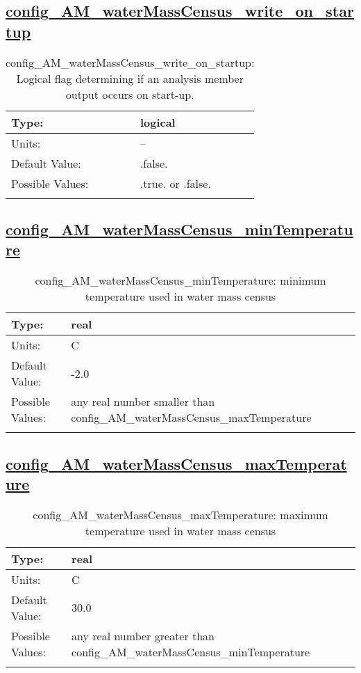 \subsection[config\_AM\_waterMassCensus\_write\_on\_startup]{\hyperref[sec:nm_tab_AM_waterMassCensus]{config\_AM\_waterMassCensus\_write\_on\_startup}}
\label{subsec:nm_sec_config_AM_waterMassCensus_write_on_startup}
\begin{center}
\begin{longtable}{| p{2.0in} || p{4.0in} |}
    \hline
    Type: & logical \\
    \hline
    Units: & -- \\
    \hline
    Default Value: & .false. \\
    \hline
    Possible Values: & .true. or .false. \\
    \hline
    \caption{config\_AM\_waterMassCensus\_write\_on\_startup: Logical flag determining if an analysis member output occurs on start-up.}
\end{longtable}
\end{center}
\subsection[config\_AM\_waterMassCensus\_minTemperature]{\hyperref[sec:nm_tab_AM_waterMassCensus]{config\_AM\_waterMassCensus\_minTemperature}}
\label{subsec:nm_sec_config_AM_waterMassCensus_minTemperature}
\begin{center}
\begin{longtable}{| p{2.0in} || p{4.0in} |}
    \hline
    Type: & real \\
    \hline
    Units: & \si{C} \\
    \hline
    Default Value: & -2.0 \\
    \hline
    Possible Values: & any real number smaller than config\_AM\_waterMassCensus\_maxTemperature \\
    \hline
    \caption{config\_AM\_waterMassCensus\_minTemperature: minimum temperature used in water mass census}
\end{longtable}
\end{center}
\subsection[config\_AM\_waterMassCensus\_maxTemperature]{\hyperref[sec:nm_tab_AM_waterMassCensus]{config\_AM\_waterMassCensus\_maxTemperature}}
\label{subsec:nm_sec_config_AM_waterMassCensus_maxTemperature}
\begin{center}
\begin{longtable}{| p{2.0in} || p{4.0in} |}
    \hline
    Type: & real \\
    \hline
    Units: & \si{C} \\
    \hline
    Default Value: & 30.0 \\
    \hline
    Possible Values: & any real number greater than config\_AM\_waterMassCensus\_minTemperature \\
    \hline
    \caption{config\_AM\_waterMassCensus\_maxTemperature: maximum temperature used in water mass census}
\end{longtable}
\end{center}
